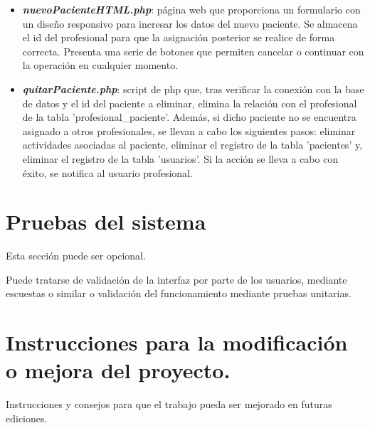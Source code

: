 \begin{itemize}
\begin{itemize}
\begin{itemize}
            \item \textbf{\textit{nuevoPacienteHTML.php}}: página web que proporciona un formulario con un diseño responsivo para incresar los datos del nuevo paciente. Se almacena el id del profesional para que la asignación posterior se realice de forma correcta. Presenta una serie de botones que permiten cancelar o continuar con la operación en cualquier momento.
            \item \textbf{\textit{quitarPaciente.php}}: script de php que, tras verificar la conexión con la base de datos y el id del paciente a eliminar, elimina la relación con el profesional de la tabla 'profesional\_paciente'. Además, si dicho paciente no se encuentra asignado a otros profesionales, se llevan a cabo los siguientes pasos: eliminar actividades asociadas al paciente, eliminar el registro de la tabla 'pacientes' y, eliminar el registro de la tabla 'usuarios'. Si la acción se lleva a cabo con éxito, se notifica al usuario profesional.
        \end{itemize}
    \end{itemize}
\end{itemize}

\section{Pruebas del sistema}
Esta sección puede ser opcional.

Puede tratarse de validación de la interfaz por parte de los usuarios, mediante escuestas o similar o validación del funcionamiento mediante pruebas unitarias.



\section{Instrucciones para la modificación o mejora del proyecto.}

Instrucciones y consejos para que el trabajo pueda ser mejorado en futuras ediciones.